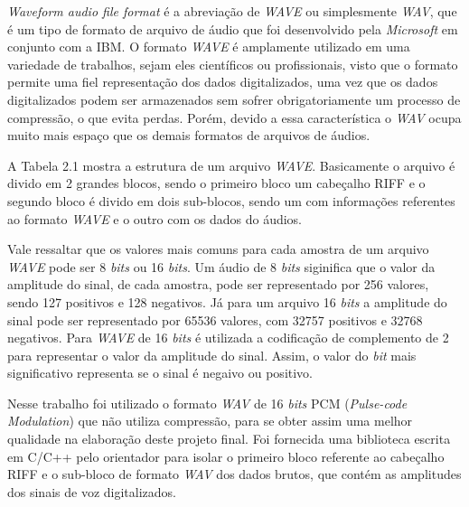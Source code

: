 \documentclass[a4paper,12pt,twoside,openright]{report}
\begin{document}
\par\textit{Waveform audio file format} \'{e} a abrevia\c{c}\~{a}o de \textit{WAVE} ou simplesmente \textit{WAV}, que \'{e} um tipo de formato de arquivo de \'{a}udio que foi desenvolvido pela \textit{Microsoft} em conjunto com a IBM. O formato \textit{WAVE} \'{e} amplamente utilizado em uma variedade de trabalhos, sejam eles cient\'{i}ficos ou profissionais, visto que o formato permite uma fiel representa\c{c}\~{a}o dos dados digitalizados, uma vez que os dados digitalizados podem ser armazenados sem sofrer obrigatoriamente um processo de compress\~{a}o, o que evita perdas. Por\'{e}m, devido a essa caracter\'{i}stica o \textit{WAV} ocupa muito mais espa\c{c}o que os demais formatos de arquivos de \'{a}udios. 

\par A Tabela 2.1 mostra a estrutura de um arquivo \textit{WAVE}. Basicamente o arquivo \'{e} divido em 2 grandes blocos, sendo o primeiro bloco um cabe{\c c}alho RIFF e o segundo bloco \'{e} divido em dois sub-blocos, sendo um com informa{\c c}\~{o}es referentes ao formato \textit{WAVE} e o outro com os dados do \'{a}udios.

\par Vale ressaltar que os valores mais comuns para cada amostra de um  arquivo \textit{WAVE} pode ser 8 \textit{bits} ou 16 \textit{bits}. Um \'{a}udio de 8 \textit{bits} siginifica que o valor da amplitude do sinal, de cada amostra, pode ser representado por 256 valores, sendo 127 positivos e 128 negativos. J\'{a} para um arquivo 16 \textit{bits} a amplitude do sinal pode ser representado por 65536 valores, com 32757 positivos e 32768 negativos. Para \textit{WAVE} de 16 \textit{bits} \'{e} utilizada a codifica{\c c}\~{a}o de complemento de 2 para representar o valor da amplitude do sinal. Assim, o valor do \textit{bit} mais significativo representa se o sinal \'{e} negaivo ou positivo.

\par Nesse trabalho foi utilizado o formato \textit{WAV} de 16 \textit{bits} PCM (\textit{Pulse-code Modulation}) que n\~{a}o utiliza compress\~{a}o, para se obter assim uma melhor qualidade na elabora\c{c}\~{a}o deste projeto final. Foi fornecida uma biblioteca escrita em C/C++ pelo orientador para isolar o primeiro bloco referente ao cabe{\c c}alho RIFF e o sub-bloco de formato \textit{WAV} dos dados brutos, que cont\'{e}m as amplitudes dos sinais de voz digitalizados.

\vspace*{+10pt}
\end{document}
